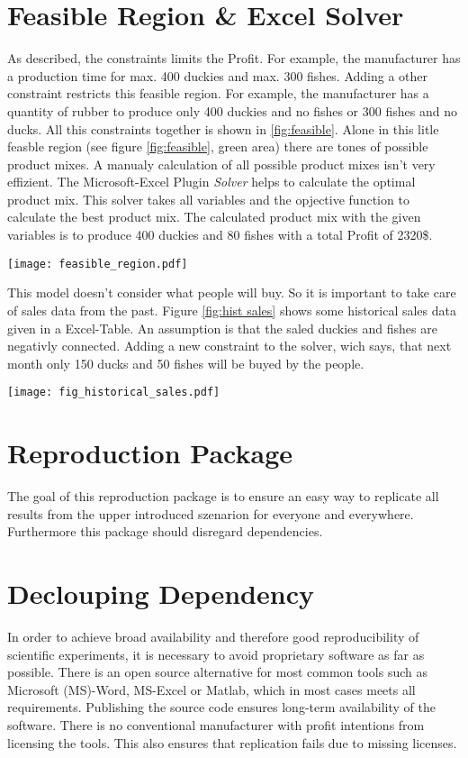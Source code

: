 \documentclass{article}
\begin{document}
\begin{multicols}{2}
\section{Feasible Region \& Excel Solver}
As described, the constraints limits the Profit. For example, the manufacturer has a production time for max. 400 duckies and max. 300 fishes. Adding a other constraint restricts this feasible region. For example, the manufacturer has a quantity of rubber to produce only 400 duckies and no fishes or 300 fishes and no ducks. All this constraints together is shown in \ref{fig:feasible}. Alone in this litle feasble region (see figure \ref{fig:feasible}, green area) there are tones of possible product mixes. A manualy calculation of all possible product mixes isn't very effizient. The Microsoft-Excel Plugin \textit{Solver} \cite{microsoft} helps to calculate the optimal product mix. This solver takes all variables and the opjective function to calculate the best product mix. The calculated product mix with the given variables is to produce 400 duckies and 80 fishes with a total Profit of 2320\$.

\begin{center}
\texttt{[image: feasible\_region.pdf]}
\label{fig:feasible}
\end{center}

This model doesn't consider what people will buy. So it is important to take care of sales data from the past. Figure \ref{fig:hist sales} shows some historical sales data given in a Excel-Table. An assumption is that the saled duckies and fishes are negativly connected. Adding a new constraint to the solver, wich says, that next month only 150 ducks and 50 fishes will be buyed by the people.


\begin{center}
\texttt{[image: fig\_historical\_sales.pdf]}
\label{fig:hist sales}
\end{center}

\section{Reproduction Package}
The goal of this reproduction package is to ensure an easy way to replicate all results from the upper introduced szenarion for everyone and everywhere. Furthermore this package should disregard dependencies.


\section{Declouping Dependency}
In order to achieve broad availability and therefore good reproducibility of scientific experiments, it is necessary to avoid proprietary software as far as possible. There is an open source alternative for most common tools such as Microsoft (MS)-Word, MS-Excel or Matlab, which in most cases meets all requirements. Publishing the source code ensures long-term availability of the software. There is no conventional manufacturer with profit intentions from licensing the tools. This also ensures that replication fails due to missing licenses.


\end{multicols}
\end{document}
